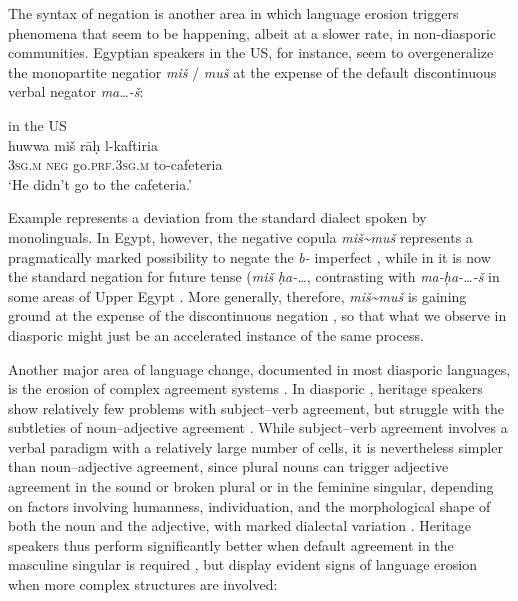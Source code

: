\documentclass[output=paper]{langsci/langscibook}
\begin{document}
The syntax of {negation} is another area in which {language erosion} triggers phenomena that seem to be happening, albeit at a slower rate, in non-diasporic communities. Egyptian speakers in the US, for instance, seem to overgeneralize the monopartite negatior \textit{miš} / \textit{muš} at the expense of the default discontinuous verbal negator \textit{ma…-š}: 

\ea\label{egy}
{ in the US \citep[482]{AlbiriniBenmamoun2015}}\\
\gll huwwa miš rāḥ l-kaftiria\\
     \textsc{3sg.m} \textsc{neg} go.\textsc{prf.3sg.m} to-cafeteria\\
\glt `He didn’t go to the cafeteria.'
\z

Example  represents a deviation from the standard  dialect spoken by monolinguals. In Egypt, however, the negative {copula} \textit{miš{\textasciitilde}muš} represents a pragmatically marked possibility to negate the \textit{b-} imperfect \citep[302]{Brustad2000}, while in  it is now the standard {negation} for {future} {tense} (\textit{miš} \textit{ḥa-…}, contrasting with \textit{ma-ḥa-…-š} in some areas of Upper Egypt \citep[285]{Brustad2000}. More generally, therefore,  \textit{miš{\textasciitilde}muš} is gaining ground at the expense of the discontinuous {negation} \citep[285]{Brustad2000}, so that what we observe in diasporic  might just be an accelerated instance of the same process.

Another major area of {language change}, documented in most diasporic languages, is the erosion of complex {agreement} systems \citep[192]{GonzoSaltarelli1983}. In diasporic , {heritage speakers} show relatively few problems with subject–verb {agreement}, but struggle with the subtleties of noun–adjective {agreement} \citep[8]{AlbiriniChakrani2013}. While subject--verb {agreement} involves a verbal paradigm with a relatively large number of cells, it is nevertheless simpler than noun–adjective {agreement}, since plural nouns can trigger adjective {agreement} in the sound or {broken plural} or in the feminine singular, depending on factors involving humanness, individuation, and the morphological shape of both the noun and the adjective, with marked dialectal variation \citep[103–104]{Danna2017article}. Heritage speakers thus perform significantly better when default {agreement} in the masculine singular is required \citep[8]{AlbiriniChakrani2013}, but display evident signs of {language erosion} when more complex structures are involved: 
\end{document}

